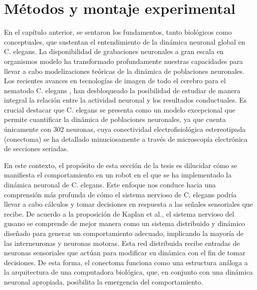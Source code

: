 \chapter{Métodos y montaje experimental}\label{cap:modeloneuronal_robot}
\graphicspath{{figs/capitulo_modelo_dinamica_neuronal/}}



En el capítulo anterior, se sentaron los fundamentos, tanto biológicos como conceptuales, que sustentan el entendimiento de la dinámica neuronal global en C. elegans. La disponibilidad de grabaciones neuronales a gran escala en organismos modelo ha transformado profundamente nuestras capacidades para llevar a cabo modelizaciones teóricas de la dinámica de poblaciones neuronales. Los recientes avances en tecnologías de imagen de todo el cerebro para el nematodo C. elegans \cite{kato_global_2015}, han desbloqueado la posibilidad de estudiar de manera integral la relación entre la actividad neuronal y los resultados conductuales. Es crucial destacar que C. elegans se presenta como un modelo excepcional que permite cuantificar la dinámica de poblaciones neuronales, ya que cuenta únicamente con 302 neuronas, cuya conectividad electrofisiológica estereotipada (conectoma) se ha detallado minuciosamente a través de microscopía electrónica de secciones seriadas\cite{cook_whole-animal_2019}.


En este contexto, el propósito de esta sección de la tesis es dilucidar cómo se manifiesta el comportamiento en un robot en el que se ha implementado la dinámica neuronal de C. elegans. Este enfoque nos conduce hacia una comprensión más profunda de cómo el sistema nervioso de C. elegans podría llevar a cabo cálculos y tomar decisiones en respuesta a las señales sensoriales que recibe. De acuerdo a la proposición de Kaplan et al., el sistema nervioso del gusano se comprende de mejor manera como un sistema distribuido y dinámico diseñado para generar un comportamiento adecuado, implicando la mayoría de las interneuronas y neuronas motoras. Esta red distribuida recibe entradas de neuronas sensoriales que actúan para modificar su dinámica con el fin de tomar decisiones. De esta forma, el conectoma funciona como una estructura análoga a la arquitectura de una computadora biológica, que, en conjunto con una dinámica neuronal apropiada, posibilita la emergencia del comportamiento.


